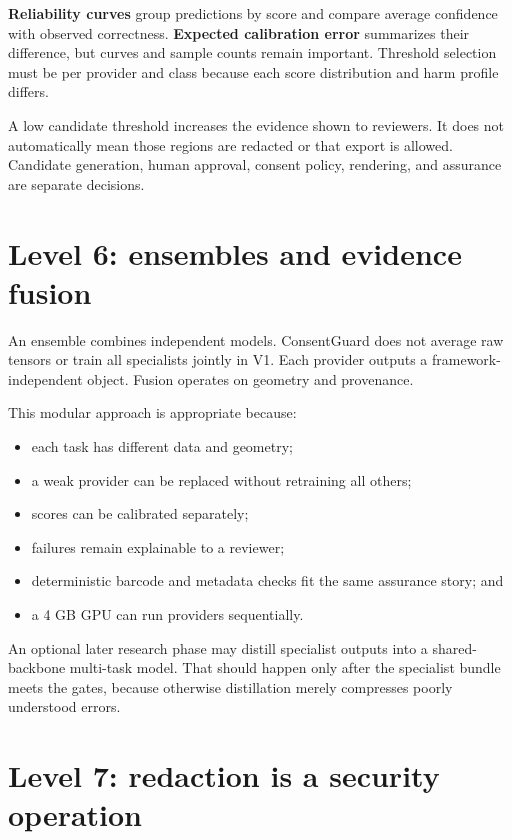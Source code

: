 \textbf{Reliability curves} group predictions by score and compare average confidence with observed correctness. \textbf{Expected calibration error} summarizes their difference, but curves and sample counts remain important. Threshold selection must be per provider and class because each score distribution and harm profile differs.

\begin{conceptbox}
A low candidate threshold increases the evidence shown to reviewers. It does not automatically mean those regions are redacted or that export is allowed. Candidate generation, human approval, consent policy, rendering, and assurance are separate decisions.
\end{conceptbox}

\section{Level 6: ensembles and evidence fusion}

An ensemble combines independent models. ConsentGuard does not average raw tensors or train all specialists jointly in V1. Each provider outputs a framework-independent  object. Fusion operates on geometry and provenance.

This modular approach is appropriate because:

\begin{itemize}[leftmargin=6mm]
  \item each task has different data and geometry;
  \item a weak provider can be replaced without retraining all others;
  \item scores can be calibrated separately;
  \item failures remain explainable to a reviewer;
  \item deterministic barcode and metadata checks fit the same assurance story; and
  \item a 4 GB GPU can run providers sequentially.
\end{itemize}

An optional later research phase may distill specialist outputs into a shared-backbone multi-task model. That should happen only after the specialist bundle meets the gates, because otherwise distillation merely compresses poorly understood errors.

\section{Level 7: redaction is a security operation}

